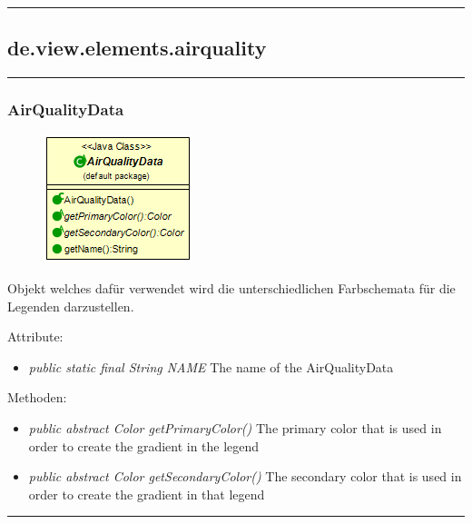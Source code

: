 \rule{\textwidth}{0.4pt}
\subsection{de.view.elements.airquality}

\rule{\textwidth}{0.4pt}
\subsubsection{AirQualityData}
\begin{minipage}{0.3\textwidth}
    \begin{figure}[H]
        {\centering\includegraphics[scale = 0.6
        ]{media/view/airquality/AirQualityData_Class.png}}
    \end{figure}
    \end{minipage} \hfill
    \begin{minipage}{0.6\textwidth}
Objekt welches dafür verwendet wird die unterschiedlichen Farbschemata für die Legenden darzustellen.
\end{minipage}
\vspace{\baselineskip}
Attribute: \begin{itemize} [noitemsep]
     \item \emph{public static final String NAME} The name of the AirQualityData
\end{itemize}
Methoden: \begin{itemize} [noitemsep]
    \item \emph{public abstract Color getPrimaryColor()} The primary color that is used in order to create the gradient in the legend
    \item \emph{public abstract Color getSecondaryColor()} The secondary color that is used in order to create the gradient in that legend
\end{itemize}

\rule{\textwidth}{0.4pt}
